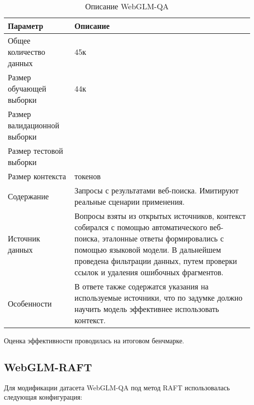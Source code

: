 \begin{table}[ht]
\centering
\caption{Описание WebGLM-QA}
\fontsize{12}{14}\selectfont
\renewcommand{\arraystretch}{1.2}
\begin{tabularx}{\textwidth}{
  >{\centering\arraybackslash}p{5cm} 
  >{\centering\arraybackslash}p{10cm}
}
\toprule
\textbf{Параметр} & \textbf{Описание} \\
\midrule
Общее количество данных & 45к \\
\midrule
Размер обучающей выборки & 44к \\
\midrule
Размер валидационной выборки & 1000 \\
\midrule
Размер тестовой выборки & 400 \\
\midrule
Размер контекста & 2048 токенов \\
\midrule
Содержание & Запросы с результатами веб-поиска. Имитируют реальные сценарии применения. \\
\midrule
Источник данных & Вопросы взяты из открытых источников, контекст собирался с помощью автоматического веб-поиска, эталонные ответы формировались с помощью языковой модели. В дальнейшем проведена фильтрации данных, путем проверки ссылок и удаления ошибочных фрагментов. \\
\midrule
Особенности & В ответе также содержатся указания на используемые источники, что по задумке должно научить модель эффективнее использовать контекст. \\
\bottomrule
\end{tabularx}
\end{table}

Оценка эффективности проводилась на итоговом бенчмарке.



\subsection{WebGLM-RAFT}
\label{subsec:raft_webglm} 

Для модификации датасета WebGLM-QA под метод RAFT использовалась следующая конфигурация:

